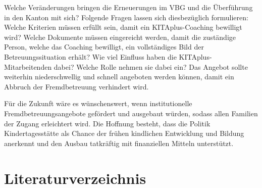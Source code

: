 \documentclass[
  ngerman,
  11pt,
  paper=a4,
  twoside,
  titlepage=true,
  openright,
  abstract=on,
  toc=listofnumbered,
  numbers=noenddot,
  chapterprefix=true,
  headings=optiontohead,
  svgnames,
  dvipsnames]{scrreprt}
\begin{document}
Welche Veränderungen bringen die Erneuerungen im VBG und die Überführung
in den Kanton mit sich? Folgende Fragen lassen sich diesbezüglich
formulieren: Welche Kriterien müssen erfüllt sein, damit ein
KITAplus-Coaching bewilligt wird? Welche Dokumente müssen eingereicht
werden, damit die zuständige Person, welche das Coaching bewilligt, ein
vollständiges Bild der Betreuungssituation erhält? Wie viel Einfluss
haben die KITAplus-Mitarbeitenden dabei? Welche Rolle nehmen sie dabei
ein? Das Angebot sollte weiterhin niederschwellig und schnell angeboten
werden können, damit ein Abbruch der Fremdbetreuung verhindert wird.

Für die Zukunft wäre es wünschenswert, wenn institutionelle
Fremdbetreuungsangebote gefördert und ausgebaut würden, sodass allen
Familien der Zugang erleichtert wird. Die Hoffnung besteht, dass die
Politik Kindertagesstätte als Chance der frühen kindlichen Entwicklung
und Bildung anerkennt und den Ausbau tatkräftig mit finanziellen Mitteln
unterstützt.

\hypertarget{literaturverzeichnis}{%
\chapter{Literaturverzeichnis}\label{literaturverzeichnis}}
\end{document}
